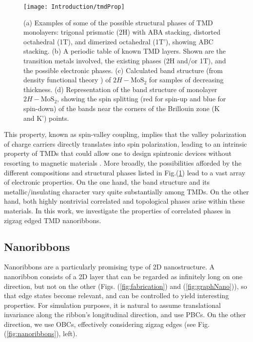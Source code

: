 \begin{figure}[H]
\centering
\texttt{[image: Introduction/tmdProp]}
 \caption[Structure and electronic properties of \ac{TMD} monolayers.]{(a) Examples of some of the possible structural phases of \ac{TMD} monolayers: trigonal prismatic (2H) with ABA stacking, distorted octahedral (1T), and dimerized octahedral (1T'), showing ABC stacking. (b) A periodic table of known \ac{TMD} layers. Shown are the transition metals involved, the existing phases (2H and/or 1T), and the possible electronic phases. (c) Calculated band structure (from density functional theory \cite{splendiani_emerging_2010} ) of $2H-\text{Mo}\text{S}_2$ for samples of decreasing thickness. (d) Representation of the band structure of monolayer $2H-\text{Mo}\text{S}_2$, showing the spin splitting (red for spin-up and blue for spin-down) of the bands near the corners of the Brillouin zone (K and K') points. \label{fig:tmdProp}}
\end{figure}

This property, known as spin-valley coupling, implies that the valley polarization of charge carriers directly translates into spin polarization, leading to an intrinsic property of \acp{TMD} that could allow one to design spintronic devices without resorting to magnetic materials \cite{manzeli_2d_2017}.
More broadly, the possibilities afforded by the different compositions and structural phases listed in Fig.(\ref{fig:tmdProp}) lead to a vast array of electronic properties.
On the one hand, the band structure and its metallic/insulating character vary quite substantially among \acp{TMD}.
On the other hand, both highly nontrivial  correlated and topological phases arise within these materials.
In this work, we investigate the properties of correlated phases in zigzag edged \ac{TMD} nanoribbons.

\subsection{Nanoribbons}\label{subsec:nanoribbons}

Nanoribbons are a particularly promising type of \acs{2D} nanostructure.
A nanoribbon consists of a \ac{2D} layer that can be regarded as infinitely long on one direction, but not on the other (Figs. (\ref{fig:fabrication}) and (\ref{fig:graphNano})), so that edge states become relevant, and can be controlled to yield interesting properties.
For simulation purposes, it is natural to assume translational invariance along the ribbon's longitudinal direction, and use \acp{PBC}.
On the other direction, we use \acp{OBC}, effectively considering zigzag edges (see Fig.(\ref{fig:nanoribbons}), left).

